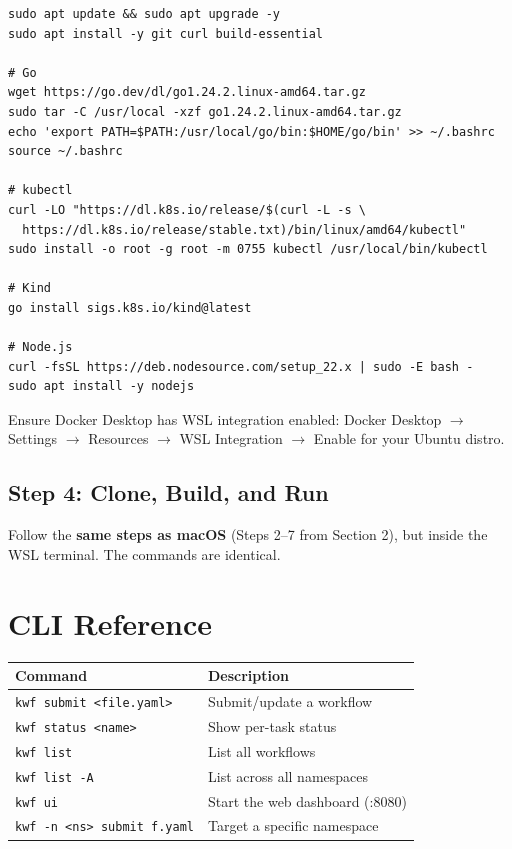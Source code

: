 \documentclass[11pt,a4paper]{article}
\begin{document}
\begin{lstlisting}
sudo apt update && sudo apt upgrade -y
sudo apt install -y git curl build-essential

# Go
wget https://go.dev/dl/go1.24.2.linux-amd64.tar.gz
sudo tar -C /usr/local -xzf go1.24.2.linux-amd64.tar.gz
echo 'export PATH=$PATH:/usr/local/go/bin:$HOME/go/bin' >> ~/.bashrc
source ~/.bashrc

# kubectl
curl -LO "https://dl.k8s.io/release/$(curl -L -s \
  https://dl.k8s.io/release/stable.txt)/bin/linux/amd64/kubectl"
sudo install -o root -g root -m 0755 kubectl /usr/local/bin/kubectl

# Kind
go install sigs.k8s.io/kind@latest

# Node.js
curl -fsSL https://deb.nodesource.com/setup_22.x | sudo -E bash -
sudo apt install -y nodejs
\end{lstlisting}

\begin{tipbox}
Ensure Docker Desktop has WSL integration enabled: Docker Desktop $\to$ Settings $\to$ Resources $\to$ WSL Integration $\to$ Enable for your Ubuntu distro.
\end{tipbox}

\subsection{Step 4: Clone, Build, and Run}

Follow the \textbf{same steps as macOS} (Steps 2--7 from Section 2), but inside the WSL terminal. The commands are identical.

\section{CLI Reference}

\begin{center}
\begin{tabular}{|l|l|}
\hline
\textbf{Command} & \textbf{Description} \\
\hline
\texttt{kwf submit <file.yaml>} & Submit/update a workflow \\
\texttt{kwf status <name>} & Show per-task status \\
\texttt{kwf list} & List all workflows \\
\texttt{kwf list -A} & List across all namespaces \\
\texttt{kwf ui} & Start the web dashboard (:8080) \\
\texttt{kwf -n <ns> submit f.yaml} & Target a specific namespace \\
\hline
\end{tabular}
\end{center}
\end{document}
